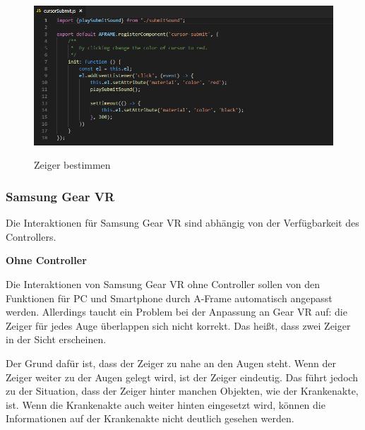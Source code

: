 \begin{figure}[ht]
\vspace*{1em}
\centering
\caption[Zeiger bestimmen]{Zeiger bestimmen}
\includegraphics[width=\textwidth]{images/cursorSubmit.png}
\label{fig:cursorSubmit} 
\end{figure}
  
  \subsubsection{Samsung Gear VR}
  Die Interaktionen für Samsung Gear VR sind abhängig von der Verfügbarkeit des Controllers.
  
  \textbf{Ohne Controller}
  
  Die Interaktionen von Samsung Gear VR ohne Controller sollen von den Funktionen für PC und Smartphone durch A-Frame automatisch angepasst werden. Allerdings taucht ein Problem bei der Anpassung an Gear VR auf: die Zeiger für jedes Auge überlappen sich nicht korrekt. Das heißt, dass zwei Zeiger in der Sicht erscheinen.
  
  Der Grund dafür ist, dass der Zeiger zu nahe an den Augen steht. Wenn der Zeiger weiter zu der Augen gelegt wird, ist der Zeiger eindeutig. Das führt jedoch zu der Situation, dass der Zeiger hinter manchen Objekten, wie der Krankenakte, ist. Wenn die Krankenakte auch weiter hinten eingesetzt wird, können die Informationen auf der Krankenakte nicht deutlich gesehen werden.
  
